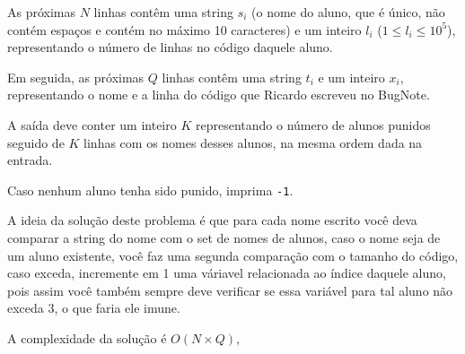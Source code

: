 As próximas $N$ linhas contêm uma string $s_i$ (o nome do aluno, que é único, não contém espaços e contém no máximo 10 caracteres) e um inteiro $l_i$ ($1 \leq l_i \leq 10^5$), representando o número de linhas no código daquele aluno.

Em seguida, as próximas $Q$ linhas contêm uma string $t_i$ e um inteiro $x_i$, representando o nome e a linha do código que Ricardo escreveu no BugNote.

A saída deve conter um inteiro $K$ representando o número de alunos punidos seguido de $K$ linhas com os nomes desses alunos, na mesma ordem dada na entrada.

Caso nenhum aluno tenha sido punido, imprima \texttt{-1}.

A ideia da solução deste problema é que para cada nome escrito você deva comparar a string do nome com o set de nomes de alunos, caso o nome seja de um aluno existente, você faz uma segunda comparação com o tamanho do código, caso exceda, incremente em 1 uma váriavel relacionada ao índice daquele aluno, pois assim você também sempre deve verificar se essa variável para tal aluno não exceda 3, o que faria ele imune.

A complexidade da solução é \(O(N \times Q)\),

